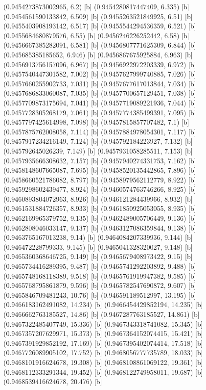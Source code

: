{{{(0.9454273873002965, 6.2) [b] 
(0.9454280817447409, 6.335) [b] 
(0.9454561590133842, 6.509) [b] 
(0.9455263521849925, 6.51) [b] 
(0.9455403908193142, 6.517) [b] 
(0.9455544294536359, 6.521) [b] 
(0.9455684680879576, 6.55) [b] 
(0.9456246226252442, 6.58) [b] 
(0.9456667385282091, 6.581) [b] 
(0.9456807771625309, 6.844) [b] 
(0.945685385185652, 6.946) [b] 
(0.9456867675925884, 6.963) [b] 
(0.9456913756157096, 6.967) [b] 
(0.9456922972203339, 6.972) [b] 
(0.9457540447301582, 7.002) [b] 
(0.9457627999740885, 7.026) [b] 
(0.9457660255902733, 7.031) [b] 
(0.9457677617013844, 7.034) [b] 
(0.9457686833060087, 7.035) [b] 
(0.9457700657129451, 7.038) [b] 
(0.9457709873175694, 7.041) [b] 
(0.9457719089221936, 7.044) [b] 
(0.9457728305268179, 7.061) [b] 
(0.9457774385499391, 7.095) [b] 
(0.9457797425614998, 7.098) [b] 
(0.9457815857707482, 7.1) [b] 
(0.9457875762008058, 7.114) [b] 
(0.9457884978054301, 7.117) [b] 
(0.9457917234216149, 7.124) [b] 
(0.945792184223927, 7.132) [b] 
(0.945792645026239, 7.149) [b] 
(0.9457931058285511, 7.153) [b] 
(0.9457935666308632, 7.157) [b] 
(0.9457940274331753, 7.162) [b] 
(0.9458148607665087, 7.695) [b] 
(0.9458520135442865, 7.896) [b] 
(0.9458660521786082, 8.797) [b] 
(0.9458979562112779, 8.922) [b] 
(0.9459298602439477, 8.924) [b] 
(0.9460574763746266, 8.925) [b] 
(0.9460893804072963, 8.926) [b] 
(0.946121284439966, 8.932) [b] 
(0.9461531884726357, 8.933) [b] 
(0.9461850925053055, 8.935) [b] 
(0.9462169965379752, 9.135) [b] 
(0.9462489005706449, 9.136) [b] 
(0.9462808046033147, 9.137) [b] 
(0.9463127086359844, 9.138) [b] 
(0.9463765167013238, 9.14) [b] 
(0.9464084207339936, 9.144) [b] 
(0.946472228799333, 9.145) [b] 
(0.9465041328320027, 9.148) [b] 
(0.9465360368646725, 9.149) [b] 
(0.9465679408973422, 9.15) [b] 
(0.9465734416289395, 9.487) [b] 
(0.9465741292203892, 9.488) [b] 
(0.9465748168118389, 9.518) [b] 
(0.9465761919947382, 9.585) [b] 
(0.9465768795861879, 9.596) [b] 
(0.9465782547690872, 9.607) [b] 
(0.9465846709481243, 10.76) [b] 
(0.946591189512997, 13.195) [b] 
(0.9466183162491082, 14.234) [b] 
(0.9466454429852194, 14.235) [b] 
(0.9466662763185527, 14.86) [b] 
(0.9467287763185527, 14.861) [b] 
(0.9467322485407749, 15.336) [b] 
(0.9467343318741082, 15.345) [b] 
(0.9467357207629971, 15.373) [b] 
(0.9467364152074415, 15.421) [b] 
(0.9467391929852192, 17.169) [b] 
(0.9467395402074414, 17.518) [b] 
(0.9467726089905102, 17.752) [b] 
(0.9468056777735789, 18.033) [b] 
(0.9468101916624678, 19.308) [b] 
(0.9468108861069122, 19.361) [b] 
(0.9468112333291344, 19.452) [b] 
(0.9468122749958011, 19.687) [b] 
(0.9468539416624678, 20.476) [b] 
}}}
